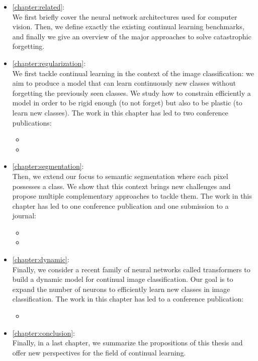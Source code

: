 \begin{itemize}
      \item \autoref{chapter:related}: \\
            We first briefly cover the neural network architectures used for computer vision. Then,
            we define exactly the existing continual learning benchmarks, and finally we give an
            overview of the major approaches to solve catastrophic forgetting.

      \item \autoref{chapter:regularization}: \\
            We first tackle continual learning in the context of the image classification: we aim to
            produce a model that can learn continuously new classes without forgetting the
            previously seen classes. We study how to constrain efficiently a model in order to be
            rigid enough (to not forget) but also to be plastic (to learn new classes). The work in
            this chapter has led to two conference publications:
            \begin{itemize}
                  \item {}
                  \item {}
            \end{itemize}

      \item \autoref{chapter:segmentation}: \\
            Then, we extend our focus to semantic segmentation where each pixel possesses a class.
            We show that this context brings new challenges and propose multiple complementary
            approaches to tackle them. The work in this chapter has led to one conference publication and one
            submission to a journal:
            \begin{itemize}
                  \item {}
                  \item {}
            \end{itemize}

      \item \autoref{chapter:dynamic}: \\
            Finally, we consider a recent family of neural networks called transformers to build a
            dynamic model for continual image classification. Our goal is to expand the number of
            neurons to efficiently learn new classes in image classification. The work in this
            chapter has led to a conference publication:
            \begin{itemize}
                  \item {}
            \end{itemize}

      \item \autoref{chapter:conclusion}: \\
            Finally, in a last chapter, we summarize the propositions of this thesis and offer
            new perspectives for the field of continual learning.

\end{itemize}

